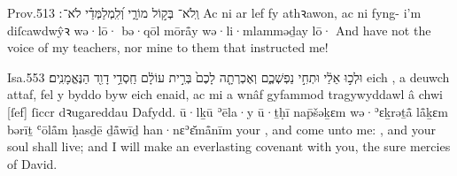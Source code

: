 \begin{example}{Prov.}{5}{13}{}{}
	\quoling
	{וְֽלֹא־ בְּק֣וֹל מוֹרָ֑י וְ֝לִֽמְלַמְּדַ֗י לֹא־ ׃}
	{Ac ni  ar lef fy athꝛawon, ac ni  fyng- i’m diſcawdwŷꝛ}
	{wə·lō· bə·qōl mōrå̄y wə·li·mlamməḏay lō· }
	{And have not  the voice of my teachers, nor  mine  to them that instructed me!}
\end{example}

\begin{example}{Isa.}{55}{3}{}{}
	\quoling
	{  וּלְכ֣וּ אֵלַ֔י  וּתְחִ֣י נַפְשְׁכֶ֑ם וְאֶכְרְתָ֤ה לָכֶם֙ בְּרִ֣ית עוֹלָ֔ם חַֽסְדֵ֥י דָוִ֖ד הַנֶּאֱמָנִֽים׃}
	{ eich , a deuwch attaf,  fel y byddo byw eich enaid, ac mi a wnâf gyfammod tragywyddawl â chwi [ſef] ſiccr dꝛugareddau Dafydd.}
	{  ū·lḵū ʾēla·y  ū·ṯḥī nap̄šəḵɛm wə·ʾɛḵrəṯå̄ lå̄ḵɛm bərīṯ ʿōlå̄m ḥasḏē ḏå̄wīḏ han·nɛʾɛ̆må̄nīm}
	{ your , and come unto me: , and your soul shall live; and I will make an everlasting covenant with you,  the sure mercies of David.}
\end{example}


